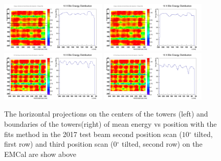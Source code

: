 \documentclass[hidelinks,11pt]{article}
\numberwithin{figure}{section}
\numberwithin{table}{section}
\newcommand{\degree}{\mbox{$^\circ$}\xspace}
\begin{document}
\begin{figure}[hbtp]
\begin{center}
\includegraphics[width=0.45\textwidth]{Plots/2017/2nd/CombY5.png}
\includegraphics[width=0.45\textwidth]{Plots/2017/2nd/CombY6.png}
\includegraphics[width=0.45\textwidth]{Plots/2017/3rd/CombY5.png}
\includegraphics[width=0.45\textwidth]{Plots/2017/3rd/CombY6.png}
\caption{The horizontal projections on the centers of the towers (left) and boundaries of the towers(right) of mean energy vs position with the fits method in the 2017 test beam second position scan ($10 \degree$ tilted, first row) and third position scan ($0 \degree$ tilted, second row) on the EMCal are show above}
\label{fig:1DProjCenH2017}
\end{center}
\end{figure} 
\end{document}
